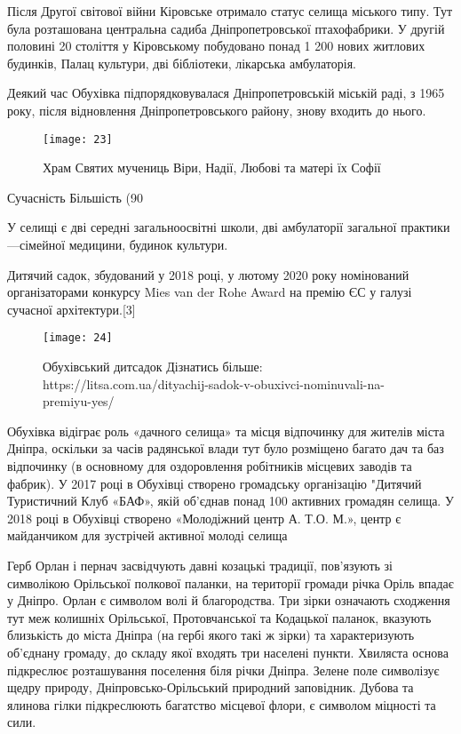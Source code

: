 Після Другої світової війни Кіровське отримало статус селища міського типу. Тут була розташована центральна садиба Дніпропетровської птахофабрики. У другій половині 20 століття у Кіровському побудовано понад 1 200 нових житлових будинків, Палац культури, дві бібліотеки, лікарська амбулаторія.

Деякий час Обухівка підпорядковувалася Дніпропетровській міській раді, з 1965 року, після відновлення Дніпропетровського району, знову входить до нього.

\begin{figure}[h]
	\centering
	\texttt{[image: 23]}
	\caption{\label{fig:frog3}Храм Святих мучениць Віри, Надії, Любові та матері їх Софії}
	\label{fig:23}
\end{figure}

Сучасність
Більшість (90 %

У селищі є дві середні загальноосвітні школи, дві амбулаторії загальної практики—сімейної медицини, будинок культури.

Дитячий садок, збудований у 2018 році, у лютому 2020 року номінований організаторами конкурсу Mies van der Rohe Award на премію ЄС у галузі сучасної архітектури.[3]
\begin{figure}
	\centering
	\texttt{[image: 24]}
	\caption{	\centering Обухівський дитсадок Дізнатись більше: https://litsa.com.ua/dityachij-sadok-v-obuxivci-nominuvali-na-premiyu-yes/}
	\label{fig:24}
\end{figure}

Обухівка відіграє роль «дачного селища» та місця відпочинку для жителів міста Дніпра, оскільки за часів радянської влади тут було розміщено багато дач та баз відпочинку (в основному для оздоровлення робітників місцевих заводів та фабрик). У 2017 році в Обухівці створено громадську організацію "Дитячий Туристичний Клуб «БАФ», якій об'єднав понад 100 активних громадян селища. У 2018 році в Обухівці створено «Молодіжний центр А. Т.О. М.», центр є майданчиком для зустрічей активної молоді селища

Герб
Орлан і пернач засвідчують давні козацькі традиції, пов’язують зі символікою Орільської полкової паланки, на території громади річка Оріль впадає у Дніпро. Орлан є символом волі й благородства. Три зірки означають сходження тут меж колишніх Орільської, Протовчанської та Кодацької паланок, вказують близькість до міста Дніпра (на гербі якого такі ж зірки) та характеризують об’єднану громаду, до складу якої входять три населені пункти. Хвиляста основа підкреслює розташування поселення біля річки Дніпра. Зелене поле символізує щедру природу, Дніпровсько-Орільський природний заповідник. Дубова та ялинова гілки підкреслюють багатство місцевої флори, є символом міцності та сили.

